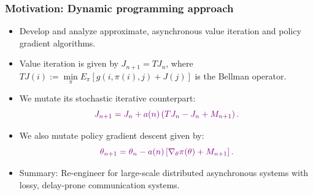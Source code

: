 \documentclass{beamer}
\begin{document}
\begin{frame}
  \frametitle{Motivation: Dynamic programming approach}
  \begin{itemize}
  \item {\color{blue} Develop and analyze approximate, asynchronous value iteration and 
  policy gradient algorithms}.
  \item Value iteration is given by $J_{n+1} = T J_n$, where
  $TJ(i) := \min \limits_{\pi} E_\pi \left[ g(i,\pi(i),j)+ J(j) \right]$ is the Bellman operator.
  \item We mutate its stochastic iterative counterpart:
   \[
    {\color{violet}J_{n+1} = J_{n} + a(n) \left( TJ_n - J_n + M_{n+1}\right).}
   \]
   \item We also mutate policy gradient descent given by:
   \[
   {\color{violet}\theta_{n+1} = \theta_n  - a(n) \left[ \nabla_\theta \pi(\theta) + M_{n+1} \right].}
   \]
   \item {\color{blue}Summary}: Re-engineer for large-scale distributed asynchronous systems
   with lossy, delay-prone communication systems.
  \end{itemize}
 \end{frame}
\end{document}
